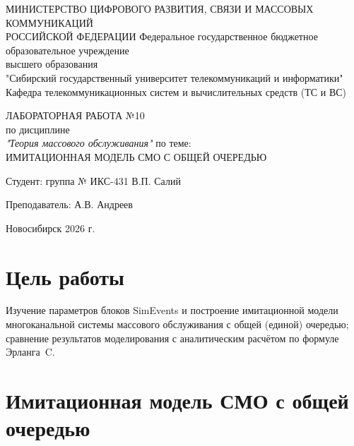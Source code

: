 \documentclass[a4paper,14pt,oneside,openany]{memoir}
\begin{document}
\thispagestyle{empty}
\begin{center}
    МИНИСТЕРСТВО ЦИФРОВОГО РАЗВИТИЯ, СВЯЗИ И МАССОВЫХ КОММУНИКАЦИЙ \\ РОССИЙСКОЙ ФЕДЕРАЦИИ
    \vspace{20pt}
    Федеральное государственное бюджетное образовательное учреждение \\ высшего образования \\
    "Сибирский государственный университет телекоммуникаций и информатики" \\
    \vspace{20pt}
    Кафедра телекоммуникационных систем и вычислительных средств (ТС и ВС)
\end{center}
\vfill
\begin{center}
    ЛАБОРАТОРНАЯ РАБОТА №10 \\
    по дисциплине \\
    \textit{"Теория массового обслуживания"}
    \vspace{20pt}
    по теме: \\
    \uppercase{Имитационная модель СМО с общей очередью}
\end{center}
\vfill
\noindent Студент: группа № ИКС-431 \hfill В.П. Салий

\vspace{20pt}

\noindent Преподаватель: \hfill А.В. Андреев
\vfill
\begin{center}
    Новосибирск 2026 г.
\end{center}

\newpage
\setcounter{page}{2}
\OnehalfSpacing*

\chapter*{Цель работы}
Изучение параметров блоков SimEvents и построение имитационной модели многоканальной системы массового обслуживания с общей (единой) очередью; сравнение результатов моделирования с аналитическим расчётом по формуле Эрланга~C.

\chapter{Имитационная модель СМО с общей очередью}
\label{ch:lab10}
\end{document}

